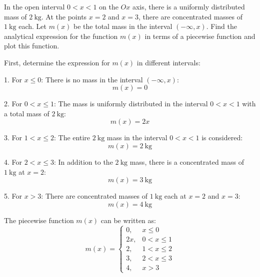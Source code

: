 \begin{exercise}
In the open interval \(0 < x < 1\) on the \(O x\) axis, there is a uniformly distributed mass of \(2 \mathrm{~kg}\). At the points \(x = 2\) and \(x = 3\), there are concentrated masses of \(1 \mathrm{~kg}\) each. Let \(m(x)\) be the total mass in the interval \((-\infty, x)\). Find the analytical expression for the function \(m(x)\) in terms of a piecewise function and plot this function.
\end{exercise}
\begin{solution}
First, determine the expression for \( m(x) \) in different intervals:

1. For \( x \leq 0 \): There is no mass in the interval \((-\infty, x)\):
   \[
   m(x) = 0
   \]

2. For \( 0 < x \leq 1 \): The mass is uniformly distributed in the interval \( 0 < x < 1 \) with a total mass of \(2 \mathrm{~kg}\):
   \[
   m(x) = 2x
   \]

3. For \( 1 < x \leq 2 \): The entire \(2 \mathrm{~kg}\) mass in the interval \( 0 < x < 1 \) is considered:
   \[
   m(x) = 2 \mathrm{~kg}
   \]

4. For \( 2 < x \leq 3 \): In addition to the \(2 \mathrm{~kg}\) mass, there is a concentrated mass of \(1 \mathrm{~kg}\) at \( x = 2 \):
   \[
   m(x) = 3 \mathrm{~kg}
   \]

5. For \( x > 3 \): There are concentrated masses of \(1 \mathrm{~kg}\) each at \( x = 2 \) and \( x = 3 \):
   \[
   m(x) = 4 \mathrm{~kg}
   \]

The piecewise function \( m(x) \) can be written as:
\[
m(x) =
\begin{cases}
0, & x \leq 0 \\
2x, & 0 < x \leq 1 \\
2, & 1 < x \leq 2 \\
3, & 2 < x \leq 3 \\
4, & x > 3
\end{cases}
\]

\begin{center}
\end{center}
\end{solution}
